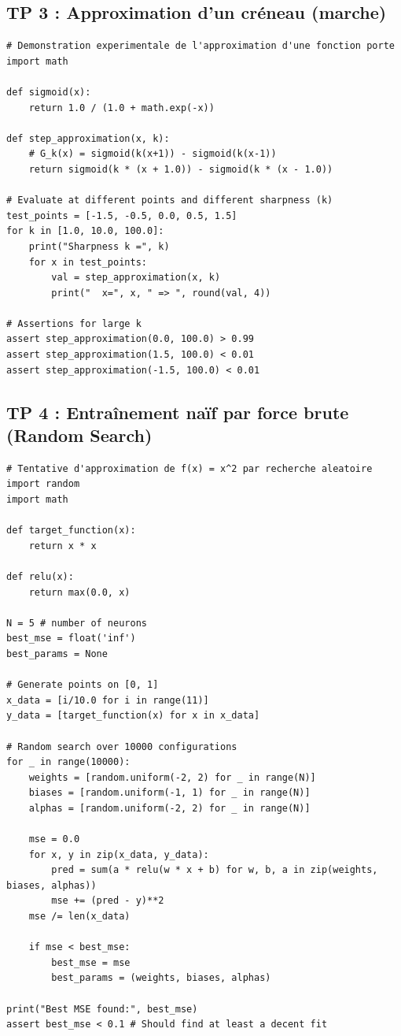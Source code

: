 \documentclass[11pt,a4paper]{article}
\begin{document}
\vspace{1cm}
\subsection*{TP 3 : Approximation d'un créneau (marche)}

\begin{lstlisting}
# Demonstration experimentale de l'approximation d'une fonction porte
import math

def sigmoid(x):
    return 1.0 / (1.0 + math.exp(-x))

def step_approximation(x, k):
    # G_k(x) = sigmoid(k(x+1)) - sigmoid(k(x-1))
    return sigmoid(k * (x + 1.0)) - sigmoid(k * (x - 1.0))

# Evaluate at different points and different sharpness (k)
test_points = [-1.5, -0.5, 0.0, 0.5, 1.5]
for k in [1.0, 10.0, 100.0]:
    print("Sharpness k =", k)
    for x in test_points:
        val = step_approximation(x, k)
        print("  x=", x, " => ", round(val, 4))

# Assertions for large k
assert step_approximation(0.0, 100.0) > 0.99
assert step_approximation(1.5, 100.0) < 0.01
assert step_approximation(-1.5, 100.0) < 0.01

\end{lstlisting}

\vspace{1cm}
\subsection*{TP 4 : Entraînement naïf par force brute (Random Search)}

\begin{lstlisting}
# Tentative d'approximation de f(x) = x^2 par recherche aleatoire
import random
import math

def target_function(x):
    return x * x

def relu(x):
    return max(0.0, x)

N = 5 # number of neurons
best_mse = float('inf')
best_params = None

# Generate points on [0, 1]
x_data = [i/10.0 for i in range(11)]
y_data = [target_function(x) for x in x_data]

# Random search over 10000 configurations
for _ in range(10000):
    weights = [random.uniform(-2, 2) for _ in range(N)]
    biases = [random.uniform(-1, 1) for _ in range(N)]
    alphas = [random.uniform(-2, 2) for _ in range(N)]

    mse = 0.0
    for x, y in zip(x_data, y_data):
        pred = sum(a * relu(w * x + b) for w, b, a in zip(weights, biases, alphas))
        mse += (pred - y)**2
    mse /= len(x_data)

    if mse < best_mse:
        best_mse = mse
        best_params = (weights, biases, alphas)

print("Best MSE found:", best_mse)
assert best_mse < 0.1 # Should find at least a decent fit

\end{lstlisting}
\end{document}
